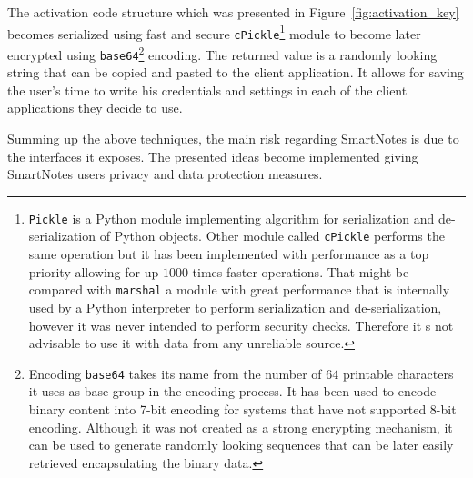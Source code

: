 \begin{itemize}
{

The activation code structure which was presented in Figure~\ref{fig:activation_key} becomes serialized using fast and secure \texttt{cPickle}\footnote{\texttt{Pickle} is a Python module implementing algorithm for serialization and de-serialization of Python objects. Other module called \texttt{cPickle} performs the same operation but it has been implemented with performance as a top priority allowing for up $1000$ times faster operations. That might be compared with \texttt{marshal} a module with great performance that is internally used by a Python interpreter to perform serialization and de-serialization, however it was never intended to perform security checks. Therefore it s not advisable to use it with data from any unreliable source.} module to become later encrypted using \texttt{base64}\footnote{Encoding \texttt{base64} takes its name from the number of $64$ printable characters it uses as base group in the encoding process. It has been used to encode binary content into 7-bit encoding for systems that have not supported 8-bit encoding. Although it was not created as a strong encrypting mechanism, it can be used to generate randomly looking sequences that can be later easily retrieved encapsulating the binary data.} encoding. The returned value is a randomly looking string that can be copied and pasted to the client application. It allows for saving the user’s time to write his credentials and settings in each of the client applications they decide to use.}
\end{itemize}
 
Summing up the above techniques, the main risk regarding SmartNotes is due to the interfaces it exposes. The presented ideas become implemented giving SmartNotes users privacy and data protection measures.
